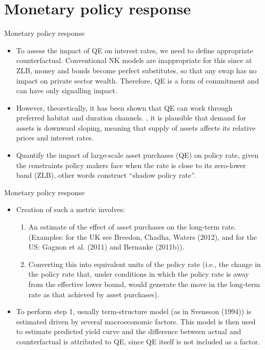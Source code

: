 \documentclass[xcolor=dvipsnames]{beamer}
\begin{document}
\section{Monetary policy response}
\begin{frame}{Monetary policy response} 
\begin{itemize}
\item To assess the impact of QE on interest rates, we need to define appropriate counterfactual. Conventional NK models are inappropriate for this since at ZLB, money and bonds become perfect substitutes, so that any swap has no impact on private sector wealth. Therefore, QE is a form of commitment and can have only signalling impact.
\item However, theoretically, it has been shown that QE can work through preferred habitat and duration channels. , it is plausible that demand for assets is downward sloping, meaning that supply of assets affects its relative prices and interest rates. 
\item Quantify the impact of large-scale asset purchases (QE) on policy rate, given the constraints policy makers face when the rate is close to its zero-lower band (ZLB), other words construct “shadow policy rate”. 
\end{itemize}
\end{frame}
\begin{frame}{Monetary policy response} 
\begin{itemize}
\item Creation of such a metric involves: 
\begin{enumerate}[i]
\item An estimate of the effect of asset purchases on the long-term rate. (Examples: for the UK see Breedon, Chadha, Waters (2012), and for the US: Gagnon et al. (2011) and Bernanke (2011b)).
\item Converting this into equivalent units of the policy rate (i.e., the change in the policy rate that, under conditions in which the policy rate is away from the effective lower bound, would generate the move in the long-term rate as that achieved by asset purchases).
\end{enumerate}
\item To perform step 1, usually term-structure model (as in Svensson (1994)) is estimated driven by several macroeconomic factors. This model is then used to estimate predicted yield curve and the difference between actual and counterfactual is attributed to QE, since QE itself is not included as a factor.
\end{itemize}
\end{frame}
\end{document}
